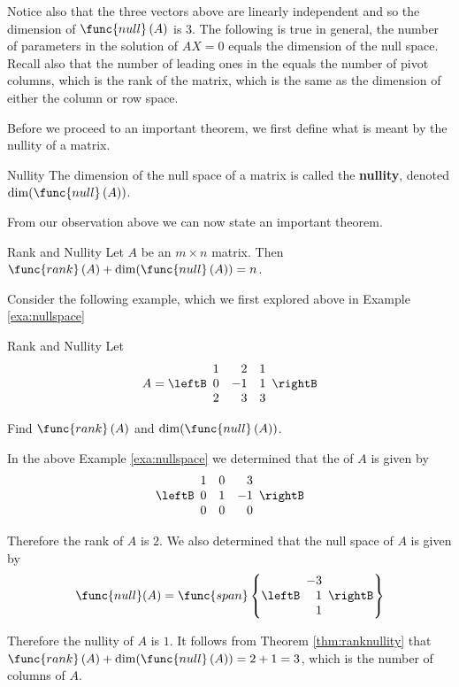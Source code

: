 Notice also that the three vectors above are linearly independent and
so the dimension of $\func{null} \left( A\right) $ is 3. The following is
true in general, the number of parameters in the solution of $AX=0$
equals the dimension of the null space. Recall also that the number of
leading ones in the \rref equals the number of pivot columns, which is
the rank of the matrix, which is the same as the dimension of either
the column or row space.

Before we proceed to an important theorem, we first define what is meant by the nullity of a matrix. 

\begin{definition}{Nullity}\label{def:nullity}
The dimension of the null space of a matrix is called the \textbf{nullity}, denoted $\dim( \func{null}\left(A\right))$.
\end{definition}

From our observation above we can now state an important theorem.

\begin{theorem}{Rank and Nullity}\label{thm:ranknullity}
Let $A$ be an $m\times n$ matrix. Then $\func{rank}\left( A\right) + \dim( \func{null}\left(A\right)) =n$. 
\end{theorem}

Consider the following example, which we first explored above in Example \ref{exa:nullspace}

\begin{example}{Rank and Nullity}\label{exa:ranknullity}
Let
\begin{equation*}
A=\leftB
\begin{array}{rrr}
1 & 2 & 1 \\
0 & -1 & 1 \\
2 & 3 & 3
\end{array}
\rightB 
\end{equation*}

Find $\func{rank}\left( A\right)$ and $\dim( \func{null}\left(A\right))$. 
\end{example}

\medskip
\begin{solution}
In the above Example \ref{exa:nullspace} we determined that the \rref \;of $A$ is given by 
\[
\leftB 
\begin{array}{rrr}
1 & 0 & 3 \\ 
0 & 1 & -1  \\
0 & 0 & 0 
\end{array}
\rightB
\]

Therefore the rank of $A$ is $2$. We also determined that the null space of $A$ is given by 
\[
\func{null} (A) = \func{span} \left\{ \leftB 
\begin{array}{r}
-3 \\ 
1 \\ 
1
\end{array}
\rightB
\right\}
\]

Therefore the nullity of $A$ is $1$. It follows from Theorem \ref{thm:ranknullity} that $\func{rank}\left( A\right) + \dim( \func{null}\left(A\right)) = 2 + 1 = 3$, which is the number of columns of $A$.
\end{solution} 

